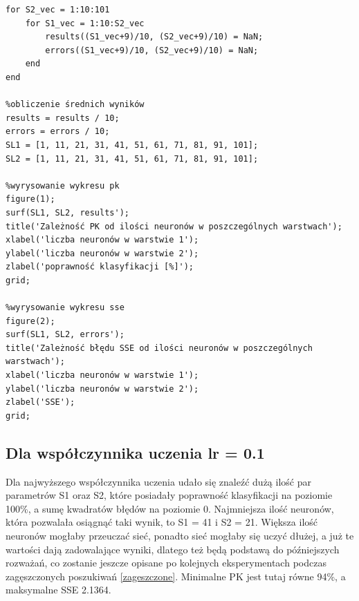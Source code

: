 \documentclass[a4paper, 12pt]{report}
\begin{document}
\begin{lstlisting}[frame=single]
%wypełnienie wartościami 'NaN' pustych miejsc w tablicy (bo S2<S1)
for S2_vec = 1:10:101
    for S1_vec = 1:10:S2_vec
        results((S1_vec+9)/10, (S2_vec+9)/10) = NaN;
        errors((S1_vec+9)/10, (S2_vec+9)/10) = NaN;
    end
end

%obliczenie średnich wyników
results = results / 10;
errors = errors / 10;
SL1 = [1, 11, 21, 31, 41, 51, 61, 71, 81, 91, 101];
SL2 = [1, 11, 21, 31, 41, 51, 61, 71, 81, 91, 101];

%wyrysowanie wykresu pk
figure(1);
surf(SL1, SL2, results');
title('Zależność PK od ilości neuronów w poszczególnych warstwach');
xlabel('liczba neuronów w warstwie 1');
ylabel('liczba neuronów w warstwie 2');
zlabel('poprawność klasyfikacji [%]');
grid;

%wyrysowanie wykresu sse
figure(2);
surf(SL1, SL2, errors');
title('Zależność błędu SSE od ilości neuronów w poszczególnych warstwach');
xlabel('liczba neuronów w warstwie 1');
ylabel('liczba neuronów w warstwie 2');
zlabel('SSE');
grid;
\end{lstlisting}

\newpage
\subsection{Dla współczynnika uczenia lr = 0.1}\label{lr01}
Dla najwyższego współczynnika uczenia udało się znaleźć dużą ilość par parametrów S1 oraz S2, które posiadały poprawność klasyfikacji na poziomie 100\%, a sumę kwadratów błędów na poziomie 0. Najmniejsza ilość neuronów, która pozwalała osiągnąć taki wynik, to S1 = 41 i S2 = 21. Większa ilość neuronów mogłaby przeuczać sieć, ponadto sieć mogłaby się uczyć dłużej, a już te wartości dają zadowalające wyniki, dlatego też będą podstawą do późniejszych rozważań, co zostanie jeszcze opisane po kolejnych eksperymentach podczas zagęszczonych poszukiwań \ref{zageszczone}. Minimalne PK jest tutaj równe 94\%, a maksymalne SSE 2.1364.
\end{document}
